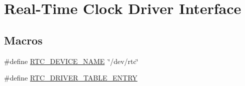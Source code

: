 \hypertarget{group__rtems__rtc}{}\section{Real-\/\+Time Clock Driver Interface}
\label{group__rtems__rtc}
\subsection*{Macros}
\begin{DoxyCompactItemize}
\item 
\#define \mbox{\hyperlink{group__rtems__rtc_ga4f7d56c14d60d29c01884d0a3486a1e9}{R\+T\+C\+\_\+\+D\+E\+V\+I\+C\+E\+\_\+\+N\+A\+ME}}~\char`\"{}/dev/rtc\char`\"{}
\item 
\#define \mbox{\hyperlink{group__rtems__rtc_gaf6b3ea67cf553292aba914e0bd0647c2}{R\+T\+C\+\_\+\+D\+R\+I\+V\+E\+R\+\_\+\+T\+A\+B\+L\+E\+\_\+\+E\+N\+T\+RY}}
\end{DoxyCompactItemize}
